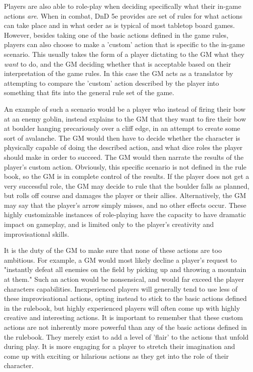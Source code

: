 \documentclass[12pt,a4paper]{report}
\begin{document}
		Players are also able to role-play when deciding specifically what their in-game actions \textit{are}. When in combat, DnD 5e provides are set of rules for what actions can take place and in what order as is typical of most tabletop board games. However, besides taking one of the basic actions defined in the game rules, players can also choose to make a 'custom' action that is specific to the in-game scenario. This usually takes the form of a player dictating to the GM what they \textit{want} to do, and the GM deciding whether that is acceptable based on their interpretation of the game rules. In this case the GM acts as a translator by attempting to compare the 'custom' action described by the player into something that fits into the general rule set of the game. 
		
		An example of such a scenario would be a player who instead of firing their bow at an enemy goblin, instead explains to the GM that they want to fire their bow at boulder hanging precariously over a cliff edge, in an attempt to create some sort of avalanche. The GM would then have to decide whether the character is physically capable of doing the described action, and what dice roles the player should make in order to succeed. The GM would then narrate the results of the player's custom action. Obviously, this specific scenario is not defined in the rule book, so the GM is in complete control of the results. If the player does not get a very successful role, the GM may decide to rule that the boulder falls as planned, but rolls off course and damages the player or their allies. Alternatively, the GM may say that the player's arrow simply misses, and no other effects occur. These highly customizable instances of role-playing have the capacity to have dramatic impact on gameplay, and is limited only to the player's creativity and improvisational skills. 
		
		It is the duty of the GM to make sure that none of these actions are too ambitious. For example, a GM would most likely decline a player's request to "instantly defeat all enemies on the field by picking up and throwing a mountain at them." Such an action would be nonsensical, and would far exceed the player characters capabilities. Inexperienced players will generally tend to use less of these improvisational actions, opting instead to stick to the basic actions defined in the rulebook, but highly experienced players will often come up with highly creative and interesting actions. It is important to remember that these custom actions are not inherently more powerful than any of the basic actions defined in the rulebook. They merely exist to add a level of 'flair' to the actions that unfold during play. It is more engaging for a player to stretch their imagination and come up with exciting or hilarious actions as they get into the role of their character. 
		
\end{document}

